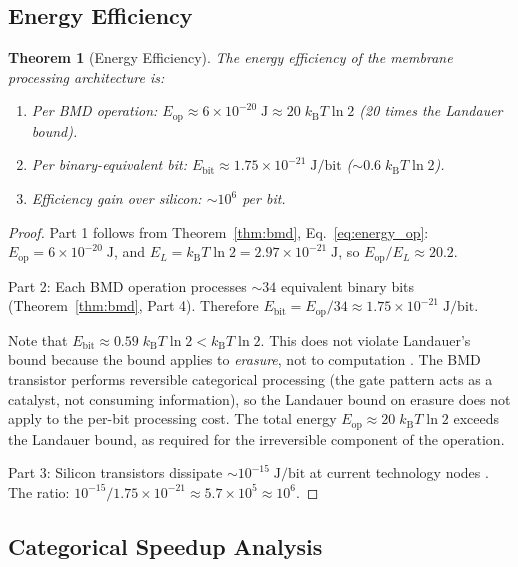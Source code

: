 \documentclass[twocolumn,10pt]{article}
\newtheorem{theorem}{Theorem}[section]
\theoremstyle{remark}
\newcommand{\kB}{k_{\mathrm{B}}}
\begin{document}
\subsection{Energy Efficiency}

\begin{theorem}[Energy Efficiency]
\label{thm:efficiency}
The energy efficiency of the membrane processing architecture is:
\begin{enumerate}
\item Per BMD operation: $E_{\mathrm{op}} \approx 6 \times 10^{-20}\;\mathrm{J} \approx 20\;\kB T \ln 2$ (20 times the Landauer bound).
\item Per binary-equivalent bit: $E_{\mathrm{bit}} \approx 1.75 \times 10^{-21}\;\mathrm{J/bit}$ ($\sim 0.6\;\kB T \ln 2$).
\item Efficiency gain over silicon: $\sim 10^6$ per bit.
\end{enumerate}
\end{theorem}

\begin{proof}
Part 1 follows from Theorem~\ref{thm:bmd}, Eq.~\eqref{eq:energy_op}: $E_{\mathrm{op}} = 6 \times 10^{-20}\;\mathrm{J}$, and $E_L = \kB T \ln 2 = 2.97 \times 10^{-21}\;\mathrm{J}$, so $E_{\mathrm{op}}/E_L \approx 20.2$.

Part 2: Each BMD operation processes $\sim 34$ equivalent binary bits (Theorem~\ref{thm:bmd}, Part 4). Therefore $E_{\mathrm{bit}} = E_{\mathrm{op}} / 34 \approx 1.75 \times 10^{-21}\;\mathrm{J/bit}$.

Note that $E_{\mathrm{bit}} \approx 0.59\;\kB T \ln 2 < \kB T \ln 2$. This does not violate Landauer's bound because the bound applies to \emph{erasure}, not to computation \cite{bennett1982}. The BMD transistor performs reversible categorical processing (the gate pattern acts as a catalyst, not consuming information), so the Landauer bound on erasure does not apply to the per-bit processing cost. The total energy $E_{\mathrm{op}} \approx 20\;\kB T \ln 2$ exceeds the Landauer bound, as required for the irreversible component of the operation.

Part 3: Silicon transistors dissipate $\sim 10^{-15}\;\mathrm{J/bit}$ at current technology nodes \cite{landauer1961,moore1965}. The ratio: $10^{-15} / 1.75 \times 10^{-21} \approx 5.7 \times 10^5 \approx 10^6$.
\end{proof}

\subsection{Categorical Speedup Analysis}
\end{document}
